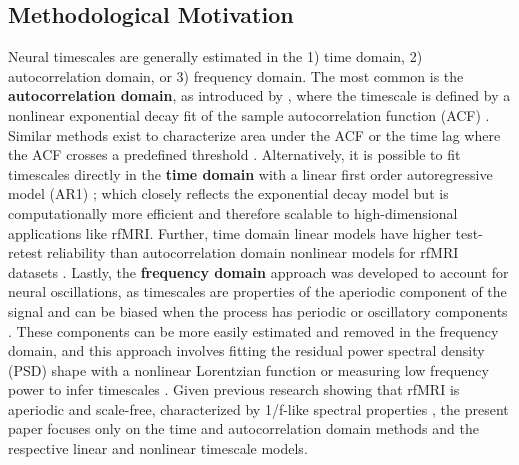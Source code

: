 \documentclass[latex/main.tex]{subfiles}
\begin{document}
\subsection{Methodological Motivation}
Neural timescales are generally estimated in the 1) time domain, 2) autocorrelation domain, or 3) frequency domain. The most common is the \textbf{autocorrelation domain}, as introduced by \citet{murray_hierarchy_2014}, where the timescale is defined by a nonlinear exponential decay fit of the sample autocorrelation function (ACF) \citep{rossi-pool_invariant_2021, cirillo_neural_2018, ito_cortical_2020, runyan_distinct_2017, zeraati_flexible_2022, nougaret_intrinsic_2021, wasmuht_intrinsic_2018, muller_core_2020, maisson_choice-relevant_2021, li_hierarchical_2022, shafiei_topographic_2020}. Similar methods exist to characterize area under the ACF \citep{wengler_distinct_2020, manea_intrinsic_2022, watanabe_atypical_2019} or the time lag where the ACF crosses a predefined threshold \citep{zilio_are_2021, raut_hierarchical_2020, golesorkhi_temporal_2021}. Alternatively, it is possible to fit timescales directly in the \textbf{time domain} with a linear first order autoregressive model (AR1) \citep{kaneoke_variance_2012, meisel_decline_2017, huang_timescales_2018, lurie_cortical_2024, shinn_functional_2023, shafiei_topographic_2020}; which closely reflects the exponential decay model \citep{murray_hierarchy_2014} but is computationally more efficient and therefore scalable to high-dimensional applications like rfMRI. Further, time domain linear models have higher test-retest reliability than autocorrelation domain nonlinear models for rfMRI datasets \citep{huang_timescales_2018, lurie_cortical_2024}. Lastly, the \textbf{frequency domain} approach was developed to account for neural oscillations, as timescales are properties of the aperiodic component of the signal and can be biased when the process has periodic or oscillatory components \citep{donoghue_parameterizing_2020, gao_neuronal_2020}. These components can be more easily estimated and removed in the frequency domain, and this approach involves fitting the residual power spectral density (PSD) shape with a nonlinear Lorentzian function or measuring low frequency power to infer timescales \citep{gao_neuronal_2020, manea_neural_2024, zeraati_flexible_2022, fallon_timescales_2020}. Given previous research showing that rfMRI is aperiodic and scale-free, characterized by 1/f-like spectral properties \citep{he_scale-free_2011, he_temporal_2010}, the present paper focuses only on the time and autocorrelation domain methods and the respective linear and nonlinear timescale models.\\ 
\end{document}
